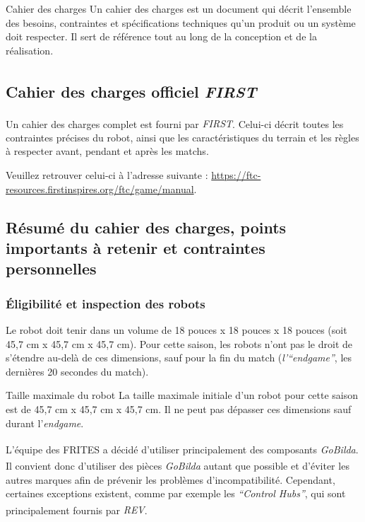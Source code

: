 \documentclass[12pt, a4paper]{report}
\newcommand{\registeredcompany}[1]{\textit{#1\textsuperscript{\tiny\textregistered}}}
\begin{document}
    \begin{mydefinition}{Cahier des charges}
        Un cahier des charges est un document qui décrit l’ensemble des besoins, contraintes et spécifications techniques qu’un produit ou un système doit respecter. Il sert de référence tout au long de la conception et de la réalisation.
    \end{mydefinition}

    \subsection{Cahier des charges officiel \registeredcompany{FIRST}}
    Un cahier des charges complet est fourni par \registeredcompany{FIRST}. Celui-ci décrit toutes les contraintes précises du robot, ainsi que les caractéristiques du terrain et les règles à respecter avant, pendant et après les matchs.

    Veuillez retrouver celui-ci à l’adresse suivante : \url{https://ftc-resources.firstinspires.org/ftc/game/manual}.

    \subsection{Résumé du cahier des charges, points importants à retenir et contraintes personnelles}

    \subsubsection{Éligibilité et inspection des robots}

    Le robot doit tenir dans un volume de 18 pouces x 18 pouces x 18 pouces (soit 45,7 cm x 45,7 cm x 45,7 cm). Pour cette saison, les robots n'ont pas le droit de s'étendre au-delà de ces dimensions, sauf pour la fin du match (\textit{l'\enquote{endgame}}, les dernières 20 secondes du match).

    \begin{mydefinition}{Taille maximale du robot}
        La taille maximale initiale d’un robot pour cette saison est de 45,7 cm x 45,7 cm x 45,7 cm. Il ne peut pas dépasser ces dimensions sauf durant l'\textit{endgame}.
    \end{mydefinition}

    L'équipe des FRITES a décidé d'utiliser principalement des composants \registeredcompany{GoBilda}. Il convient donc d'utiliser des pièces \registeredcompany{GoBilda} autant que possible et d'éviter les autres marques afin de prévenir les problèmes d'incompatibilité. Cependant, certaines exceptions existent, comme par exemple les \textit{\enquote{Control Hubs}}, qui sont principalement fournis par \registeredcompany{REV}.
\end{document}
